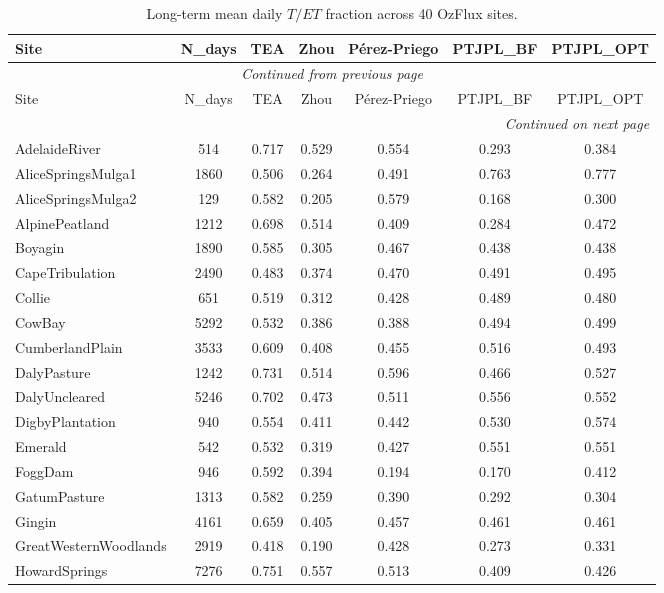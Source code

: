\documentclass[11pt,a4paper]{article}
\begin{document}
\begin{longtable}{lcccccc}
\caption{Long-term mean daily $T/ET$ fraction across 40 OzFlux sites.} \label{tab:site_means} \\
\toprule
Site & N\_days & TEA & Zhou & Pérez-Priego & PTJPL\_BF & PTJPL\_OPT \\
\midrule
\endfirsthead
\multicolumn{7}{c}{{\textit{Continued from previous page}}} \\
\toprule
Site & N\_days & TEA & Zhou & Pérez-Priego & PTJPL\_BF & PTJPL\_OPT \\
\midrule
\endhead
\midrule
\multicolumn{7}{r}{{\textit{Continued on next page}}} \\
\endfoot
\bottomrule
\endlastfoot
  AdelaideRiver & 514 & 0.717 & 0.529 & 0.554 & 0.293 & 0.384 \\
  AliceSpringsMulga1 & 1860 & 0.506 & 0.264 & 0.491 & 0.763 & 0.777 \\
  AliceSpringsMulga2 & 129 & 0.582 & 0.205 & 0.579 & 0.168 & 0.300 \\
  AlpinePeatland & 1212 & 0.698 & 0.514 & 0.409 & 0.284 & 0.472 \\
  Boyagin & 1890 & 0.585 & 0.305 & 0.467 & 0.438 & 0.438 \\
  CapeTribulation & 2490 & 0.483 & 0.374 & 0.470 & 0.491 & 0.495 \\
  Collie & 651 & 0.519 & 0.312 & 0.428 & 0.489 & 0.480 \\
  CowBay & 5292 & 0.532 & 0.386 & 0.388 & 0.494 & 0.499 \\
  CumberlandPlain & 3533 & 0.609 & 0.408 & 0.455 & 0.516 & 0.493 \\
  DalyPasture & 1242 & 0.731 & 0.514 & 0.596 & 0.466 & 0.527 \\
  DalyUncleared & 5246 & 0.702 & 0.473 & 0.511 & 0.556 & 0.552 \\
  DigbyPlantation & 940 & 0.554 & 0.411 & 0.442 & 0.530 & 0.574 \\
  Emerald & 542 & 0.532 & 0.319 & 0.427 & 0.551 & 0.551 \\
  FoggDam & 946 & 0.592 & 0.394 & 0.194 & 0.170 & 0.412 \\
  GatumPasture & 1313 & 0.582 & 0.259 & 0.390 & 0.292 & 0.304 \\
  Gingin & 4161 & 0.659 & 0.405 & 0.457 & 0.461 & 0.461 \\
  GreatWesternWoodlands & 2919 & 0.418 & 0.190 & 0.428 & 0.273 & 0.331 \\
  HowardSprings & 7276 & 0.751 & 0.557 & 0.513 & 0.409 & 0.426 \\

\end{longtable}
\end{document}
